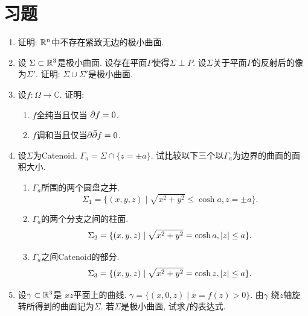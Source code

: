 \section{习题}
\begin{enumerate}
    \item 证明: $\mathbb{R}^n$中不存在紧致无边的极小曲面.
    \item 设 $\Sigma \subset \mathbb{R}^3$是极小曲面. 设存在平面$P$使得$\Sigma \perp P$. 设$\Sigma$关于平面$P$的反射后的像为$\Sigma'$. 证明: $\Sigma \cup \Sigma'$是极小曲面.
    \item 设$f: \Omega \to \mathbb{C}$. 证明:
    \begin{enumerate}
        \item $f$全纯当且仅当 ${\bar{\partial}} f=0$.
        \item $f$调和当且仅当$\partial {\bar{\partial}} f=0$.
    \end{enumerate}
    \item 设$\Sigma$为Catenoid. $\Gamma_a=\Sigma \cap \{z=\pm a\}$. 试比较以下三个以$\Gamma_a$为边界的曲面的面积大小.
    \begin{enumerate}
        \item $\Gamma_a$所围的两个圆盘之并.  
        \begin{equation*}
            \Sigma_1=\{(x,y,z)\mid \sqrt{x^2+y^2} \le \cosh a, z=\pm a\}.
        \end{equation*}
        \item $\Gamma_a$的两个分支之间的柱面. 
        \begin{equation*}
            \Sigma_2=\{(x,y,z)\mid \sqrt{x^2+y^2} = \cosh a, \left | z \right | \le a\}.
        \end{equation*}
        \item $\Gamma_a$之间Catenoid的部分. 
        \begin{equation*}
            \Sigma_3=\{(x,y,z)\mid  \sqrt{x^2+y^2}=\cosh z, \left | z \right | \le a \}.
        \end{equation*}
    \end{enumerate}
    \item 设$\gamma\subset \mathbb{R}^3$是 $xz$平面上的曲线. $\gamma= \{(x,0,z)\mid x=f(z) >0 \}$. 由$\gamma$ 绕$z$轴旋转所得到的曲面记为$\Sigma$. 若$\Sigma$是极小曲面, 试求$f$的表达式.
\end{enumerate}